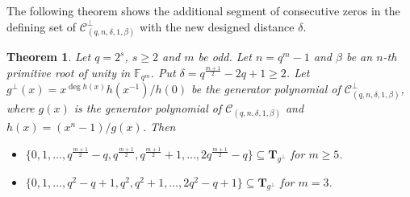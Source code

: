 \documentclass[journal,12pt,onecolumn]{IEEEtran}
\newtheorem{theorem}{Theorem}
\begin{document}
The following theorem shows the additional segment of consecutive zeros in the defining set of $\mathcal{C}_{(q,n,\delta,1,\beta)}^\perp$ with the new designed distance $\delta$.

\begin{theorem}
	\label{4 small delta}
	Let $q=2^s$, $s\ge 2$ and $m$ be odd. Let $n=q^m-1$ and $\beta$ be an $n$-th primitive root of unity in $\mathbb{F}_{q^m}$. Put $\delta=q^{\frac{m+1}{2}}-2q+1\ge2$. Let $g^\perp(x)=x^{\deg h(x)}h(x^{-1})/h(0)$ be the generator polynomial of $\mathcal{C}_{(q,n,\delta,1,\beta)}^\perp$, where $g(x)$ is the generator polynomial of $\mathcal{C}_{(q,n,\delta,1,\beta)}$ and $h(x)=(x^n-1)/g(x)$. Then
	\begin{itemize}
		\item $\{0,1,\dots,q^\frac{m+1}{2}-q,q^\frac{m+1}{2},q^\frac{m+1}{2}+1,\dots,2q^\frac{m+1}{2}-q\}\subseteq \textbf{T}_{g^\perp}$ for $m\ge5$.
		\item $\{0,1,\dots,q^2-q+1,q^2,q^2+1,\dots,2q^2-q+1\}\subseteq \textbf{T}_{g^\perp}$ for $m=3$.
	\end{itemize}
\end{theorem}
\end{document}
